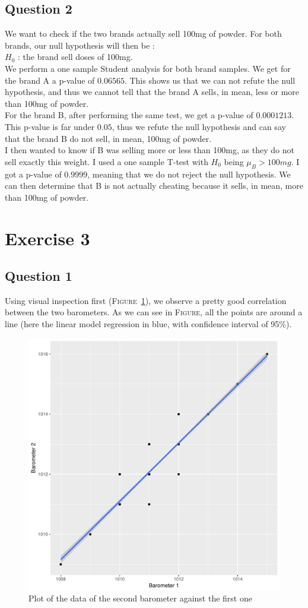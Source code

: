 \documentclass[12pt,a4paper]{article}
\begin{document}
\subsection*{Question 2}
We want to check if the two brands actually sell 100mg of powder. For both brands, our null hypothesis will then be :\\
$H_0$ : the brand sell doses of 100mg.\\
We perform a one sample Student analysis for both brand samples. We get for the brand A a p-value of $0.06565$. This shows us that we can not refute the null hypothesis, and thus we cannot tell that the brand A sells, in mean, less or more than 100mg of powder.\\
For the brand B, after performing the same test, we get a p-value of $0.0001213$. This p-value is far under $0.05$, thus we refute the null hypothesis and can say that the brand B do not sell, in mean, 100mg of powder.\\

I then wanted to know if B was selling more or less than 100mg, as they do not sell exactly this weight. I used a one sample T-test with $H_0$ being $\mu_B > 100mg$. I got a p-value of $0.9999$, meaning that we do not reject the null hypothesis. We can then determine that B is not actually cheating because it sells, in mean, more than 100mg of powder.

\section*{Exercise 3}
\subsection*{Question 1}
Using visual inspection first (\textsc{Figure}~\ref{corr3}), we observe a pretty good correlation between the two barometers. As we can see in \textsc{Figure}, all the points are around a line (here the linear model regression in blue, with confidence interval of 95\%).\\

\begin{figure}
  \begin{center}
    \includegraphics[width=0.6\linewidth]{corr3.pdf}
    \caption{Plot of the data of the second barometer against the first one}
    \label{corr3}
  \end{center}
\end{figure}
\end{document}
